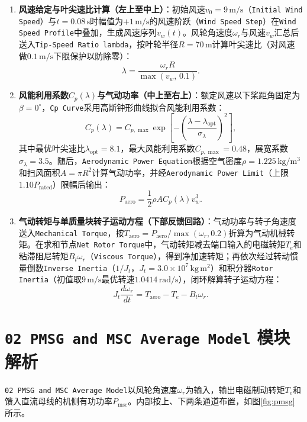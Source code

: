 \documentclass[UTF8,zihao=-4,fontset=none]{ctexrep}
\begin{document}
\begin{enumerate}
  \item \textbf{风速给定与叶尖速比计算（左上至中上）}：初始风速\(v_0=9\,\mathrm{m/s}\)（\texttt{Initial Wind Speed}）与\(t=0.08\,\mathrm{s}\)时幅值为\(+1\,\mathrm{m/s}\)的风速阶跃（\texttt{Wind Speed Step}）在\texttt{Wind Speed Profile}中叠加，生成风速序列\(v_w(t)\)。风轮角速度\(\omega_r\)与风速\(v_w\)汇总后送入\texttt{Tip-Speed Ratio lambda}，按叶轮半径\(R=70\,\mathrm{m}\)计算叶尖速比（对风速做\(0.1\,\mathrm{m/s}\)下限保护以防除零）：
  \begin{equation}
    \lambda=\frac{\omega_r R}{\max(v_w,\,0.1)}.
  \end{equation}
  \item \textbf{风能利用系数\(C_p(\lambda)\)与气动功率（中上至右上）}：额定风速以下桨距角固定为\(\beta=0^\circ\)，\texttt{Cp Curve}采用高斯钟形曲线拟合风能利用系数：
  \begin{equation}
    C_p(\lambda)=C_{p,\max}\exp\!\left[-\left(\frac{\lambda-\lambda_{\mathrm{opt}}}{\sigma_\lambda}\right)^2\right],
  \end{equation}
  其中最优叶尖速比\(\lambda_{\mathrm{opt}}=8.1\)，最大风能利用系数\(C_{p,\max}=0.48\)，展宽系数\(\sigma_\lambda=3.5\)。随后，\texttt{Aerodynamic Power Equation}根据空气密度\(\rho=1.225\,\mathrm{kg/m^3}\)和扫风面积\(A=\pi R^2\)计算气动功率，并经\texttt{Aerodynamic Power Limit}（上限\(1.10P_{\mathrm{rated}}\)）限幅后输出：
  \begin{equation}
    P_{\mathrm{aero}}=\frac{1}{2}\rho A C_p(\lambda)v_w^3.
  \end{equation}
  \item \textbf{气动转矩与单质量块转子运动方程（下部反馈回路）}：气动功率与转子角速度送入\texttt{Mechanical Torque}，按\(T_{\mathrm{aero}}=P_{\mathrm{aero}}/\max(\omega_r,0.2)\)折算为气动机械转矩。在求和节点\texttt{Net Rotor Torque}中，气动转矩减去端口输入的电磁转矩\(T_e\)和粘滞阻尼转矩\(B_t\omega_r\)（\texttt{Viscous Torque}），得到净加速转矩；再依次经过转动惯量倒数\texttt{Inverse Inertia}（\(1/J_t\)，\(J_t=3.0\times10^7\,\mathrm{kg\,m^2}\)）和积分器\texttt{Rotor Inertia}（初值取\(9\,\mathrm{m/s}\)最优转速\(1.0414\,\mathrm{rad/s}\)），闭环解算转子运动方程：
  \begin{equation}
    J_t\frac{d\omega_r}{dt}=T_{\mathrm{aero}}-T_e-B_t\omega_r.
  \end{equation}
\end{enumerate}

\section{\texttt{02 PMSG and MSC Average Model} 模块解析}
\texttt{02 PMSG and MSC Average Model}以风轮角速度\(\omega_r\)为输入，输出电磁制动转矩\(T_e\)和馈入直流母线的机侧有功功率\(P_{\mathrm{msc}}\)。内部按上、下两条通道布置，如图\ref{fig:pmsg}所示。
\end{document}
